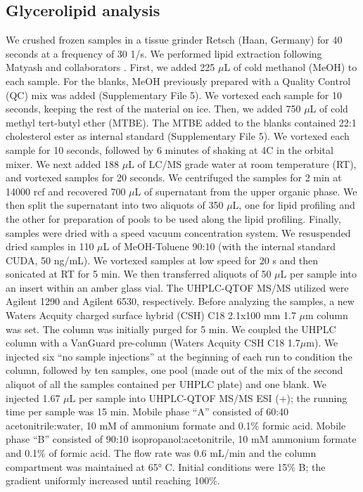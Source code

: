 \documentclass[9pt,twocolumn,twoside,lineno]{BioRxiv}
\begin{document}
\subsection{Glycerolipid analysis} 
We crushed frozen samples in a tissue grinder Retsch (Haan, Germany) for 40 seconds at a frequency of 30 1/s. 
We performed lipid extraction following Matyash and collaborators \cite{Matyash2008-ue}. 
First, we added 225 $\mu$L of cold methanol (MeOH) to each sample. 
For the blanks, MeOH previously prepared with a Quality Control (QC) mix was added (Supplementary File 5).
We vortexed each sample for 10 seconds, keeping the rest of the material on ice. 
Then, we added 750 $\mu$L of cold methyl tert-butyl ether (MTBE). 
The MTBE added to the blanks contained 22:1 cholesterol ester as internal standard (Supplementary File 5). 
We vortexed each sample for 10 seconds, followed by 6 minutes of shaking at 4\degree C in the orbital mixer. 
We next added 188 $\mu$L of LC/MS grade water at room temperature (RT), and vortexed samples for 20 seconds.
We centrifuged the samples for 2 min at 14000 rcf and recovered 700 $\mu$L of supernatant from the upper organic phase. 
We then split the supernatant into two aliquots of 350 $\mu$L, one for lipid profiling and the other for preparation of pools to be used along the lipid profiling. 
Finally, samples were dried with a speed vacuum concentration system.
We resuspended dried samples in 110 $\mu$L of MeOH-Toluene 90:10 (with the internal standard CUDA, 50 ng/mL). 
We vortexed samples at low speed for 20 s and then sonicated at RT for 5 min. 
We then transferred aliquots of 50 $\mu$L per sample into an insert within an amber glass vial.
The UHPLC-QTOF MS/MS utilized were Agilent 1290 and Agilent 6530, respectively. 
Before analyzing the samples, a new Waters Acquity charged surface hybrid (CSH) C18 2.1x100 mm 1.7 $\mu$m column was set. 
The column was initially purged for 5 min. 
We coupled the UHPLC column with a VanGuard pre-column (Waters Acquity CSH C18 1.7$\mu$m). 
We injected six “no sample injections” at the beginning of each run to condition the column, followed by ten samples, one pool (made out of the mix of the second aliquot of all the samples contained per UHPLC plate) and one blank.
We injected 1.67 $\mu$L per sample into UHPLC-QTOF MS/MS ESI (+); the running time per sample was 15 min. 
Mobile phase “A” consisted of 60:40 acetonitrile:water, 10 mM of ammonium formate and 0.1\% formic acid. 
Mobile phase “B” consisted of 90:10 isopropanol:acetonitrile, 10 mM ammonium formate and 0.1\% of formic acid. 
The flow rate was 0.6 mL/min and the column compartment was maintained at 65° C. Initial conditions were 15\% B; the gradient uniformly increased until reaching 100\%. 
\end{document}
